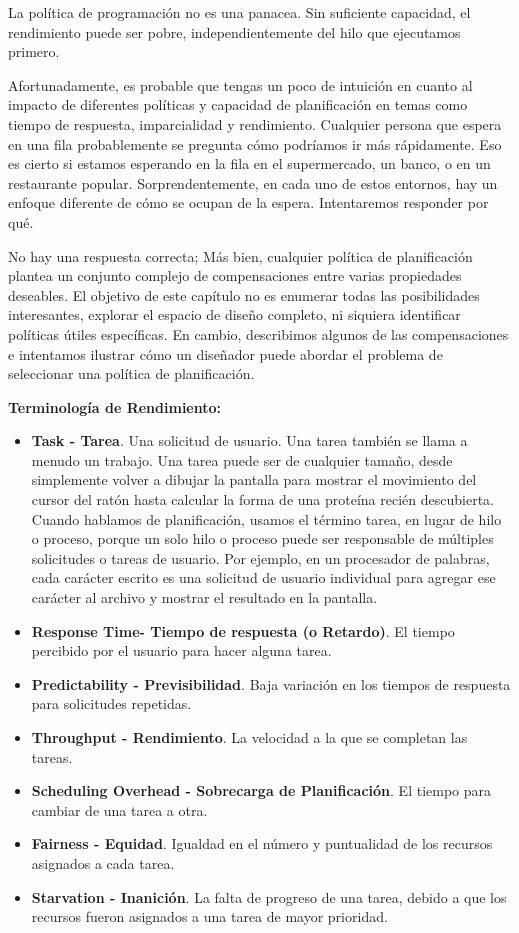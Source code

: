 \documentclass[10pt]{book}
\begin{document}
La política de programación no es una panacea. Sin suficiente capacidad, el rendimiento puede ser pobre, independientemente del hilo que ejecutamos primero.

Afortunadamente, es probable que tengas un poco de intuición en cuanto al impacto de diferentes políticas y capacidad de planificación en temas como tiempo de respuesta, imparcialidad y rendimiento. Cualquier persona que espera en una fila probablemente se pregunta cómo podríamos ir más rápidamente. Eso es cierto si estamos esperando en la fila en el supermercado, un banco, o en un restaurante popular. Sorprendentemente, en cada uno de estos entornos, hay un enfoque diferente de cómo se ocupan de la espera. Intentaremos responder por qué.

No hay una respuesta correcta; Más bien, cualquier política de planificación plantea un conjunto complejo de compensaciones entre varias propiedades deseables. El objetivo de este capítulo no es enumerar todas las posibilidades interesantes, explorar el espacio de diseño completo, ni siquiera identificar políticas útiles específicas. En cambio, describimos algunos de las compensaciones e intentamos ilustrar cómo un diseñador puede abordar el problema de seleccionar una política de planificación.

\textbf{Terminología de Rendimiento:}

\begin{itemize}
\item \textbf{Task - Tarea}. Una solicitud de usuario. Una tarea también se llama a menudo un trabajo. Una tarea puede ser de cualquier tamaño, desde simplemente volver a dibujar la pantalla para mostrar el movimiento del cursor del ratón hasta calcular la forma de una proteína recién descubierta. Cuando hablamos de planificación, usamos el término tarea, en lugar de hilo o proceso, porque un solo hilo o proceso puede ser responsable de múltiples solicitudes o tareas de usuario. Por ejemplo, en un procesador de palabras, cada carácter escrito es una solicitud de usuario individual para agregar ese carácter al archivo y mostrar el resultado en la pantalla.
\item \textbf{Response Time- Tiempo de respuesta (o Retardo)}. El tiempo percibido por el usuario para hacer alguna tarea.
\item \textbf{Predictability - Previsibilidad}. Baja variación en los tiempos de respuesta para solicitudes repetidas.
\item \textbf{Throughput - Rendimiento}. La velocidad a la que se completan las tareas.
\item \textbf{Scheduling Overhead - Sobrecarga de Planificación}. El tiempo para cambiar de una tarea a otra.
\item \textbf{Fairness - Equidad}. Igualdad en el número y puntualidad de los recursos asignados a cada tarea.
\item \textbf{Starvation - Inanición}. La falta de progreso de una tarea, debido a que los recursos fueron asignados a una tarea de mayor prioridad.
\end{itemize}
\end{document}
